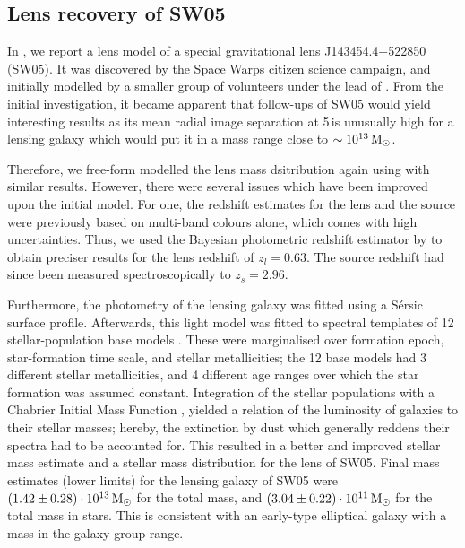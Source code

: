 \subsection{Lens recovery of SW05}

In , we report a lens model of a special gravitational lens
J143454.4+522850 (SW05).  It was discovered by the Space Warps citizen science
campaign, and initially modelled by a smaller group of volunteers under the lead
of .  From the initial investigation, it became apparent
that follow-ups of SW05 would yield interesting results as its mean radial image
separation at 5\,\arcsec is unusually high for a lensing galaxy which would put
it in a mass range close to $\sim10^{13}\,\mathrm{M_{\odot}}$.

Therefore, we free-form modelled the lens mass dsitribution again using
 with similar results.  However, there were several issues which
have been improved upon the initial model.  For one, the redshift estimates for
the lens and the source were previously based on multi-band colours alone, which
comes with high uncertainties.  Thus, we used the Bayesian photometric redshift
estimator  by  to obtain preciser results for the lens
redshift of $z_{l} = 0.63$. The source redshift had since been measured
spectroscopically to $z_{s} = 2.96$.

Furthermore, the photometry of the lensing galaxy was fitted using a S\'ersic
surface profile.
Afterwards, this light model was fitted to spectral templates of 12
stellar-population base models .
These were marginalised over formation epoch, star-formation time scale, and
stellar metallicities; the 12 base models had 3 different stellar metallicities,
and 4 different age ranges over which the star formation was assumed constant.
Integration of the stellar populations with a Chabrier Initial Mass Function
, yielded a relation of the luminosity of galaxies to
their stellar masses; hereby, the extinction by dust which generally reddens
their spectra had to be accounted for.  This resulted in a better and improved
stellar mass estimate and a stellar mass distribution for the lens of SW05.
Final mass estimates (lower limits) for the lensing galaxy of SW05 were
$(1.42\pm0.28)\cdot10^{13}\,\mathrm{M_{\odot}}$ for the total mass, and
$(3.04\pm0.22)\cdot10^{11}\,\mathrm{M_{\odot}}$ for the total mass in stars.  This is
consistent with an early-type elliptical galaxy with a mass in the galaxy group
range.

